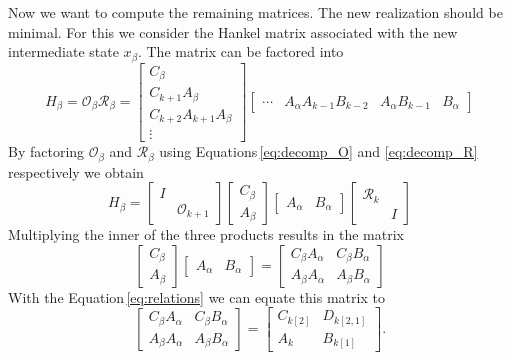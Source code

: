 \documentclass[numbers=noenddot,doctype=mastersthesis,BCOR=15mm,biblatex]{ldvbook}%
\newcommand{\R}{\mathcal{R}} %
\newcommand{\Ob}{\mathcal{O}} %
\newcommand{\eye}{I} %
\begin{document}
Now we want to compute the remaining matrices.
The new realization should be minimal.
For this we consider the Hankel matrix associated with the new intermediate state $x_\beta$.
The matrix can be factored into
\begin{equation}
H_\beta = \Ob_\beta \R_\beta 
= \begin{bmatrix} C_\beta \\ C_{k+1} A_\beta \\ C_{k+2} A_{k+1} A_\beta \\ \vdots \end{bmatrix}
\begin{bmatrix} \cdots& A_\alpha A_{k-1}B_{k-2} & A_\alpha B_{k-1}&  B_\alpha  \end{bmatrix}
\end{equation}
By factoring $ \Ob_\beta $ and $\R_\beta $ using Equations\,\ref{eq:decomp_O} and \ref{eq:decomp_R} respectively we obtain
\begin{equation}
H_\beta
= \begin{bmatrix} \eye &\\ & \mathcal{O}_{k+1} \end{bmatrix} \begin{bmatrix} C_\beta \\  A_\beta \end{bmatrix}
\begin{bmatrix} A_\alpha &  B_\alpha  \end{bmatrix} \begin{bmatrix} \mathcal{R}_k\\&\eye \end{bmatrix}
\end{equation}
Multiplying the inner of the three products results in the matrix
\begin{equation}
\begin{bmatrix} C_\beta \\  A_\beta \end{bmatrix}
\begin{bmatrix} A_\alpha &  B_\alpha  \end{bmatrix}
=
\begin{bmatrix}
C_\beta A_\alpha & C_\beta B_\alpha\\
A_\beta A_\alpha & A_\beta B_\alpha
\end{bmatrix}
\end{equation}
With the Equation\,\ref{eq:relations} we can equate this matrix to 
\begin{equation}
\begin{bmatrix}
C_\beta A_\alpha & C_\beta B_\alpha\\
A_\beta A_\alpha & A_\beta B_\alpha
\end{bmatrix}
=
\begin{bmatrix}
C_{k[2]} & D_{k[2,1]}\\
A_k & B_{k[1]}
\end{bmatrix}
.
\end{equation}
\end{document}
